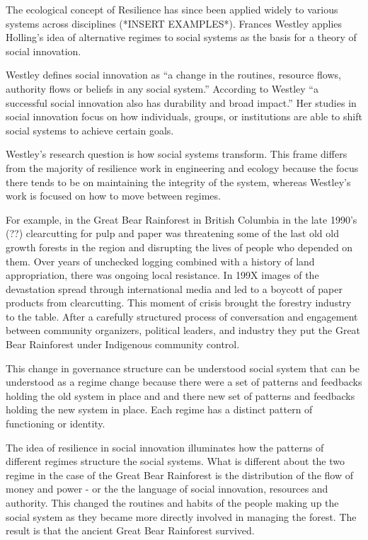 The ecological concept of Resilience has since been applied widely to various systems across disciplines (*INSERT EXAMPLES*). Frances Westley applies Holling's idea of alternative regimes to social systems as the basis for a theory of social innovation. 

Westley defines social innovation as ``a change in the routines, resource flows, authority flows or beliefs in any social system.'' According to Westley ``a successful social innovation also has durability and broad impact.'' 
Her studies in social innovation focus on how individuals, groups, or institutions are able to shift social systems to achieve certain goals. 

Westley's research question is how social systems transform. This frame differs from the majority of resilience work in engineering and ecology because the focus there tends to be on maintaining the integrity of the system, whereas Westley's work is focused on how to move between regimes. 

For example, in the Great Bear Rainforest in British Columbia in the late 1990's (??) clearcutting for pulp and paper was threatening some of the last old old growth forests in the region and disrupting the lives of people who depended on them. Over years of unchecked logging combined with a history of land appropriation, there was ongoing local resistance. In 199X images of the devastation spread through international media and led to a boycott of paper products from clearcutting. This moment of crisis brought the forestry industry to the table. After a carefully structured process of conversation and engagement between community organizers, political leaders, and industry they put the Great Bear Rainforest under Indigenous community control. 

This change in governance structure can be understood social system that can be understood as a regime change because there were a set of patterns and feedbacks holding the old system in place and and there new set of patterns and feedbacks holding the new system in place. Each regime has a distinct pattern of functioning or identity. 

The idea of resilience in social innovation illuminates how the patterns of different regimes structure the social systems. What is different about the two regime in the case of the Great Bear Rainforest is the distribution of the flow of money and power - or the the language of social innovation, resources and authority. This changed the routines and habits of the people making up the social system as they became more directly involved in managing the forest. The result is that the ancient Great Bear Rainforest survived. 

